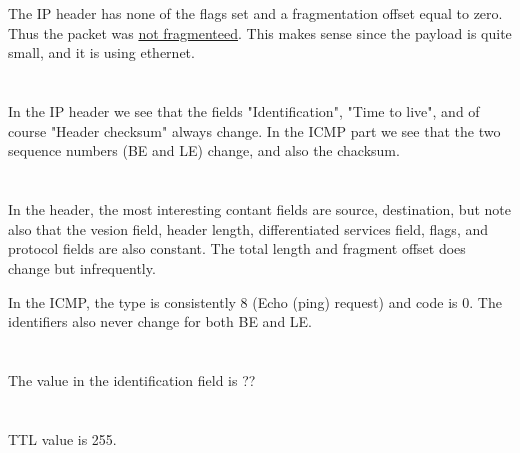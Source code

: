 \documentclass{article}
\begin{document}
\section{}
The IP header has none of the flags set and a fragmentation offset equal to zero. Thus the packet was \underline{not fragmenteed}. This makes sense since the payload is quite small, and it is using ethernet. 

\section{}
In the IP header we see that the fields "Identification", "Time to live", and of course "Header checksum" always change. 
In the ICMP part we see that the two sequence numbers (BE and LE) change, and also the chacksum. 

\section{}
In the header, the most interesting contant fields are source, destination, but note also that the vesion field, header length, differentiated services field, flags, and protocol fields are also constant.
The total length and fragment offset does change but infrequently. 

In the ICMP, the type is consistently 8 (Echo (ping) request) and code is 0. The identifiers also never change for both BE and LE. 

\section{}
The value in the identification field is ??

\section{}
TTL value is 255.
\end{document}
